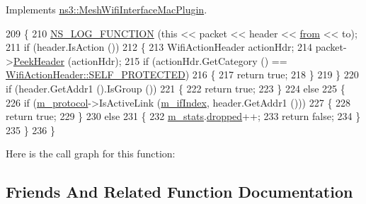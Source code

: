 Implements \hyperlink{classns3_1_1MeshWifiInterfaceMacPlugin_af14bbe6ab750951c0291b0e4144d2caf}{ns3\+::\+Mesh\+Wifi\+Interface\+Mac\+Plugin}.


\begin{DoxyCode}
209 \{
210   \hyperlink{log-macros-disabled_8h_a90b90d5bad1f39cb1b64923ea94c0761}{NS\_LOG\_FUNCTION} (\textcolor{keyword}{this} << packet << header << \hyperlink{lte__amc_8m_a1b4c81ff74eb1a626b5ade44c81004b3}{from} << to);
211   \textcolor{keywordflow}{if} (header.IsAction ())
212     \{
213       WifiActionHeader actionHdr;
214       packet->\hyperlink{classns3_1_1Packet_aadc63487bea70945c418f4c3e9b81964}{PeekHeader} (actionHdr);
215       \textcolor{keywordflow}{if} (actionHdr.GetCategory () == \hyperlink{classns3_1_1WifiActionHeader_a5402becd11b4077f22d76c4d0d923358a0d41e6327b2a9ae590e3020f378e40e4}{WifiActionHeader::SELF\_PROTECTED}) 
216         \{
217           \textcolor{keywordflow}{return} \textcolor{keyword}{true};
218         \}
219     \}
220   \textcolor{keywordflow}{if} (header.GetAddr1 ().IsGroup ())
221     \{
222       \textcolor{keywordflow}{return} \textcolor{keyword}{true};
223     \}
224   \textcolor{keywordflow}{else}
225     \{
226       \textcolor{keywordflow}{if} (\hyperlink{classns3_1_1dot11s_1_1PeerManagementProtocolMac_afbdd1f31cd54c320267ffb3426559095}{m\_protocol}->IsActiveLink (\hyperlink{classns3_1_1dot11s_1_1PeerManagementProtocolMac_a6127e7b929975cae23d8ef639e254991}{m\_ifIndex}, header.GetAddr1 ()))
227         \{
228           \textcolor{keywordflow}{return} \textcolor{keyword}{true};
229         \}
230       \textcolor{keywordflow}{else}
231         \{
232           \hyperlink{classns3_1_1dot11s_1_1PeerManagementProtocolMac_aaaccd87941623a8bff20e8998908b518}{m\_stats}.\hyperlink{structns3_1_1dot11s_1_1PeerManagementProtocolMac_1_1Statistics_a9c584bdb0d2f08ee00a2bd3ec4b4b062}{dropped}++;
233           \textcolor{keywordflow}{return} \textcolor{keyword}{false};
234         \}
235     \}
236 \}
\end{DoxyCode}


Here is the call graph for this function\+:




\subsection{Friends And Related Function Documentation}
